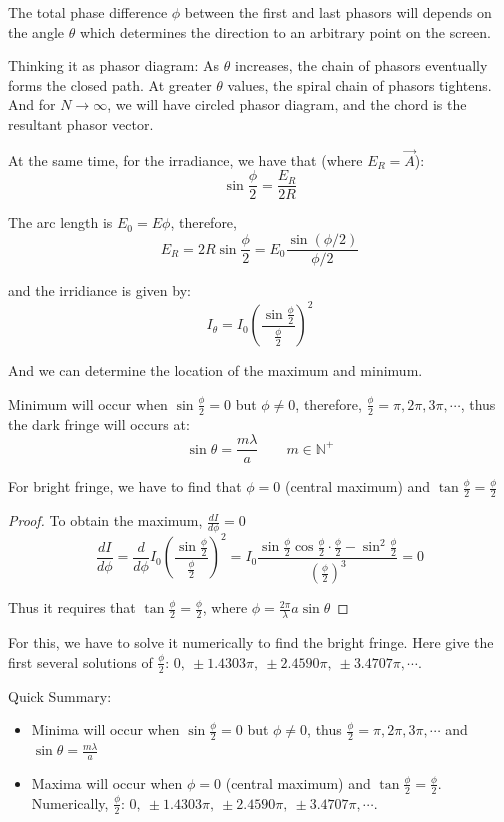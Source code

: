 \documentclass[UTF8]{book}
\begin{document}
The total phase difference $\phi $ between the first and last phasors will depends on the angle $\theta $ which determines the direction to an arbitrary point on the screen.

Thinking it as phasor diagram: As $\theta $ increases, the chain of phasors eventually forms the closed path. At greater $\theta $ values, the spiral chain of phasors tightens. And for $N\to \infty$, we will have circled phasor diagram, and the chord is the resultant phasor vector. 

At the same time, for the irradiance, we have that (where $E_R =\vec{A}$):
\[\sin \frac{\phi}{2}=\frac{E_R}{2R}\]

The arc length is $E_0=E\phi $, therefore,
\[E_R=2R\sin \frac{\phi }{2}=E_0\frac{\sin (\phi /2)}{\phi /2}\]

and the irridiance is given by:
\[I_{\theta }=I_0\left(\frac{\sin \frac{\phi}{2} }{\frac{\phi }{2}}\right)^2\]

And we can determine the location of the maximum and minimum. 

Minimum will occur when $\sin \frac{\phi }{2} =0$ but $\phi \neq 0$, therefore, $\frac{\phi}{2} =\pi,2\pi,3\pi,\cdots $, thus the dark fringe will occurs at:
\[\sin \theta =\frac{m\lambda }{a}\qquad m\in \mathbb{N}^+\]

For bright fringe, we have to find that $\phi =0$ (central maximum) and $\tan \frac{\phi }{2}= \frac{\phi }{2}$
\begin{proof}
To obtain the maximum, $\frac{dI}{d\phi }=0$
\[\frac{dI}{d\phi}=\frac{d}{d\phi}I_0\left(\frac{\sin \frac{\phi}{2}}{\frac{\phi }{2}}\right)^2=I_0\frac{\sin \frac{\phi }{2}\cos \frac{\phi }{2}\cdot \frac{\phi }{2}-\sin ^2\frac{\phi }{2}}{(\frac{\phi }{2})^3}=0\]

Thus it requires that $\tan \frac{\phi }{2}= \frac{\phi }{2}$, where $\phi =\frac{2\pi }{\lambda }a\sin \theta$
\end{proof}

For this, we have to solve it numerically to find the bright fringe. Here give the first several solutions of $\frac{\phi }{2}$: $0,\  \pm 1.4303\pi,\  \pm 2.4590\pi,\  \pm 3.4707\pi,\cdots $.

Quick Summary:
\begin{itemize}
\item Minima will occur when $\sin \frac{\phi }{2} =0$ but $\phi \neq 0$, thus $\frac{\phi}{2} =\pi,2\pi,3\pi,\cdots $ and $\sin \theta =\frac{m\lambda }{a}$
\item Maxima will occur when $\phi =0$ (central maximum) and $\tan \frac{\phi }{2}= \frac{\phi }{2}$. Numerically, $\frac{\phi }{2}$: $0,\  \pm 1.4303\pi,\  \pm 2.4590\pi,\  \pm 3.4707\pi,\cdots $.
\end{itemize}
\end{document}
